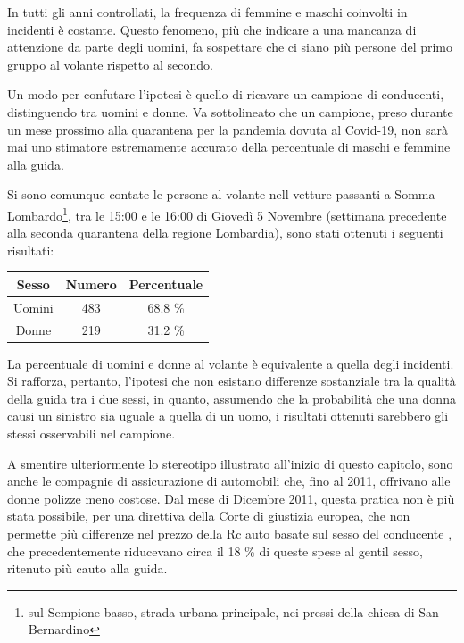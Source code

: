 \documentclass[a4paper]{report}
\begin{document}
In tutti gli anni controllati, la frequenza di femmine e maschi coinvolti 
in incidenti è costante. 
Questo fenomeno, più che indicare a una mancanza di attenzione da parte degli uomini, 
fa sospettare che ci siano più persone del primo gruppo al volante rispetto al secondo. 

Un modo per confutare l'ipotesi è quello di ricavare un campione di conducenti, 
distinguendo tra uomini e donne. 
Va sottolineato che un campione, preso durante un mese prossimo alla quarantena per 
la pandemia dovuta al Covid-19, non sarà mai uno stimatore estremamente 
accurato della percentuale di maschi e femmine alla guida. 

Si sono comunque contate le persone al volante nell vetture passanti a Somma 
Lombardo\footnote{sul Sempione basso, strada urbana principale, 
nei pressi della chiesa di San Bernardino}, 
tra le 15:00 e le 16:00 di Giovedì 5 Novembre 
(settimana precedente alla seconda quarantena della regione Lombardia), 
sono stati ottenuti i seguenti risultati:

\begin{center}
    \def\arraystretch{1.5}%
    \begin{tabular}{ |c|c|c| }
        \hline
        Sesso & Numero & Percentuale \\ 
        \hline
        \rowcolor{TableGray}
        Uomini & 483 & 68.8 \% \\
        Donne & 219 & 31.2 \% \\
        \hline
    \end{tabular}
\end{center}

La percentuale di uomini e donne al volante è equivalente a quella degli incidenti. 
Si rafforza, pertanto, l'ipotesi che non esistano differenze sostanziale tra la qualità 
della guida tra i due sessi, in quanto, assumendo che la probabilità che una donna causi un 
sinistro sia uguale a quella di un uomo, i risultati ottenuti sarebbero 
gli stessi osservabili nel campione. 

A smentire ulteriormente lo stereotipo illustrato all'inizio di questo capitolo, sono 
anche le compagnie di assicurazione di automobili che, fino al 2011, offrivano 
alle donne polizze meno costose. 
Dal mese di Dicembre 2011, questa pratica non è più stata possibile, per una direttiva della 
Corte di giustizia europea, che non permette più differenze nel prezzo della Rc auto basate 
sul sesso del conducente \cite{CORRIERE:1}, che precedentemente riducevano circa il 
18 \% di queste spese al gentil sesso, ritenuto più cauto alla guida. 
\end{document}
